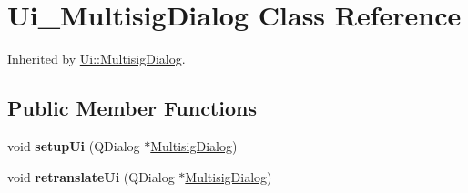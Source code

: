 \hypertarget{class_ui___multisig_dialog}{}\section{Ui\+\_\+\+Multisig\+Dialog Class Reference}
\label{class_ui___multisig_dialog}


Inherited by \mbox{\hyperlink{class_ui_1_1_multisig_dialog}{Ui\+::\+Multisig\+Dialog}}.

\subsection*{Public Member Functions}
\begin{DoxyCompactItemize}
\item 
\mbox{\label{class_ui___multisig_dialog_aad6cb436bae414a59136e8514c8cf9ea}} 
void {\bfseries setup\+Ui} (Q\+Dialog $\ast$\mbox{\hyperlink{class_multisig_dialog}{Multisig\+Dialog}})
\item 
\mbox{\label{class_ui___multisig_dialog_a8c594df23f0058e04c893b7c0e5e0daa}} 
void {\bfseries retranslate\+Ui} (Q\+Dialog $\ast$\mbox{\hyperlink{class_multisig_dialog}{Multisig\+Dialog}})
\end{DoxyCompactItemize}
